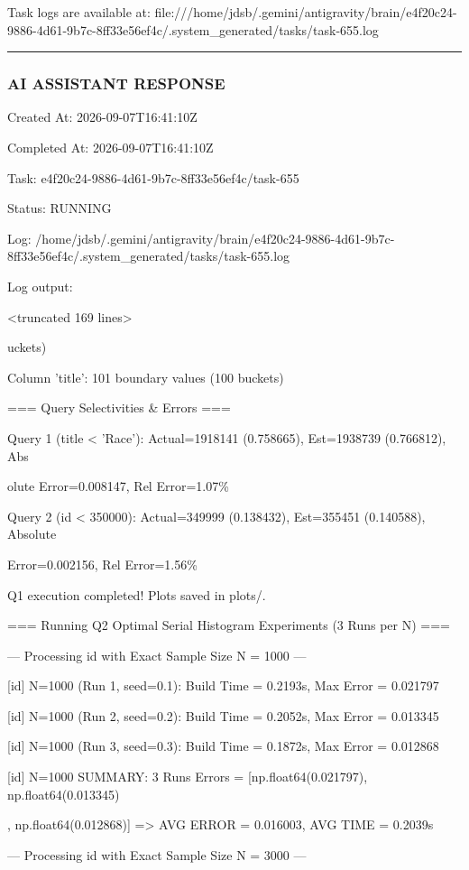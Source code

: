 \documentclass[11pt,a4paper]{article}
\begin{document}
Task logs are available at: file:///home/jdsb/.gemini/antigravity/brain/e4f20c24-9886-4d61-9b7c-8ff33e56ef4c/.system\_generated/tasks/task-655.log


\hrule

\subsubsection{AI ASSISTANT RESPONSE}

Created At: 2026-09-07T16:41:10Z

Completed At: 2026-09-07T16:41:10Z

Task: e4f20c24-9886-4d61-9b7c-8ff33e56ef4c/task-655

Status: RUNNING

Log: /home/jdsb/.gemini/antigravity/brain/e4f20c24-9886-4d61-9b7c-8ff33e56ef4c/.system\_generated/tasks/task-655.log

Log output:

<truncated 169 lines>

uckets)

Column 'title': 101 boundary values (100 buckets)

=== Query Selectivities \& Errors ===

Query 1 (title < 'Race'): Actual=1918141 (0.758665), Est=1938739 (0.766812), Abs

olute Error=0.008147, Rel Error=1.07\%

Query 2 (id < 350000): Actual=349999 (0.138432), Est=355451 (0.140588), Absolute

Error=0.002156, Rel Error=1.56\%

Q1 execution completed! Plots saved in plots/.

=== Running Q2 Optimal Serial Histogram Experiments (3 Runs per N) ===


--- Processing id with Exact Sample Size N = 1000 ---

[id] N=1000 (Run 1, seed=0.1): Build Time = 0.2193s, Max Error = 0.021797

[id] N=1000 (Run 2, seed=0.2): Build Time = 0.2052s, Max Error = 0.013345

[id] N=1000 (Run 3, seed=0.3): Build Time = 0.1872s, Max Error = 0.012868

[id] N=1000 SUMMARY: 3 Runs Errors = [np.float64(0.021797), np.float64(0.013345)

, np.float64(0.012868)] => AVG ERROR = 0.016003, AVG TIME = 0.2039s

--- Processing id with Exact Sample Size N = 3000 ---
\end{document}
